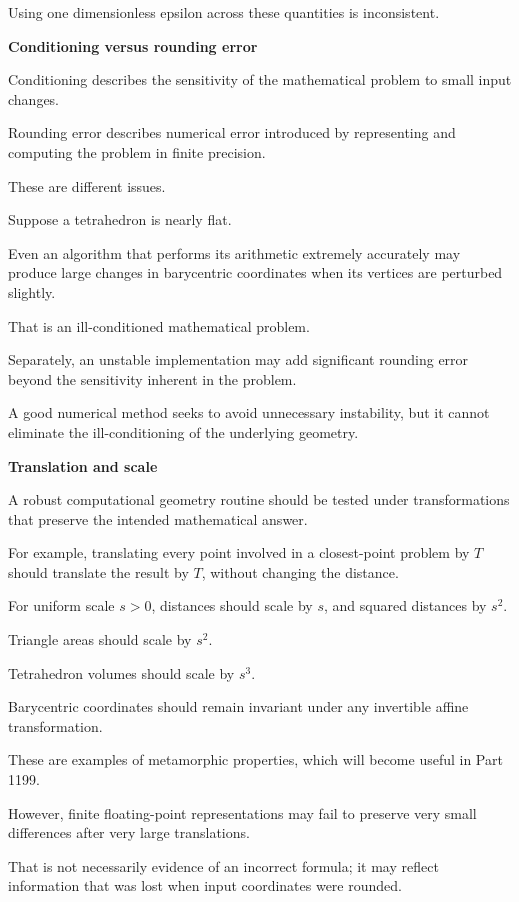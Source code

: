 Using one dimensionless epsilon across these quantities is inconsistent.

\textbf{Conditioning versus rounding error}

Conditioning describes the sensitivity of the mathematical problem to small input changes.

Rounding error describes numerical error introduced by representing and computing the problem in finite precision.

These are different issues.

Suppose a tetrahedron is nearly flat.

Even an algorithm that performs its arithmetic extremely accurately may produce large changes in barycentric coordinates when its vertices are perturbed slightly.

That is an ill-conditioned mathematical problem.

Separately, an unstable implementation may add significant rounding error beyond the sensitivity inherent in the problem.

A good numerical method seeks to avoid unnecessary instability, but it cannot eliminate the ill-conditioning of the underlying geometry.

\textbf{Translation and scale}

A robust computational geometry routine should be tested under transformations that preserve the intended mathematical answer.

For example, translating every point involved in a closest-point problem by \(T\) should translate the result by \(T\), without changing the distance.

For uniform scale \(s>0\), distances should scale by \(s\), and squared distances by \(s^2\).

Triangle areas should scale by \(s^2\).

Tetrahedron volumes should scale by \(s^3\).

Barycentric coordinates should remain invariant under any invertible affine transformation.

These are examples of metamorphic properties, which will become useful in Part 1199.

However, finite floating-point representations may fail to preserve very small differences after very large translations.

That is not necessarily evidence of an incorrect formula; it may reflect information that was lost when input coordinates were rounded.


